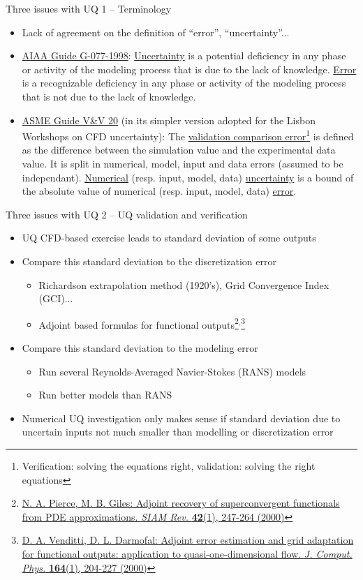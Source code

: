 \documentclass[10pt]{beamer}
\def\vr{\vspace{3mm}}
\def\begit{\begin{itemize}}
\def\endit{\end{itemize}}
\begin{document}
%
%
\begin{frame}{Three issues with UQ} {1 -- Terminology}
%
\begit
%
\item Lack of agreement on the definition of ``error'', ``uncertainty''...
\vr
\item\href{\webDOI/10.2514/4.472855}{AIAA Guide G-077-1998}: \underline{Uncertainty} is a potential deficiency in any phase or activity of the modeling
 process that is due to the lack of knowledge. 
\underline{Error} is a recognizable deficiency in any phase or activity of the modeling process that is not due to the lack of knowledge.
\vr
\item \href{https://www.asme.org/codes-standards/find-codes-standards/v-v-20-standard-verification-validation-computational-fluid-dynamics-heat-transfer}{ASME Guide V\&V 20} (in its simpler version adopted for the Lisbon Workshops on CFD uncertainty):
  The \underline{validation comparison error}\footnote{\scriptsize{Verification: solving the equations right, validation: solving the right equations}} is defined as the difference between the simulation value and
 the experimental data value. It is split in numerical, model, input and data errors (assumed to be independant).  \underline{Numerical} (resp. input, model, data)
 \underline{uncertainty} is a bound of the absolute value of numerical (resp. input, model, data) \underline{error}.
%
\endit
%
\end{frame} 
%
%
\begin{frame}{Three issues with UQ}{ 2 -- UQ validation and verification } 
%
\begit
\item UQ CFD-based exercise leads to standard deviation of some outputs
\vr
\item  Compare this standard deviation to the discretization error 
  \begit
  \item Richardson extrapolation method (1920's), Grid Convergence Index (GCI)...
  \item Adjoint based formulas for functional outputs\footnote{\href{\webDOI/10.1137/S0036144598349423}{\scriptsize{N. A. Pierce, M. B. Giles: Adjoint recovery of superconvergent functionals from PDE approximations. {\sl SIAM Rev.} {\bf 42}(1), 247-264 (2000)}}}$^,$\footnote{\href{\webDOI/10.1006/jcph.2000.6600}{\scriptsize{D. A. Venditti, D. L. Darmofal: Adjoint error estimation and grid adaptation for functional outputs: application to quasi-one-dimensional flow. {\sl J. Comput. Phys.} {\bf 164}(1), 204-227 (2000)}}}
   \endit
\vr
\item  Compare this standard deviation to the modeling error 
  \begit
  \item  Run several Reynolds-Averaged Navier-Stokes (RANS) models 
  \item  Run better models than RANS 
  \endit
\vr
\item  Numerical UQ investigation only makes sense if standard deviation due to uncertain inputs not much smaller
 than modelling or discretization error
\endit
%
\end{frame} 
\end{document}
